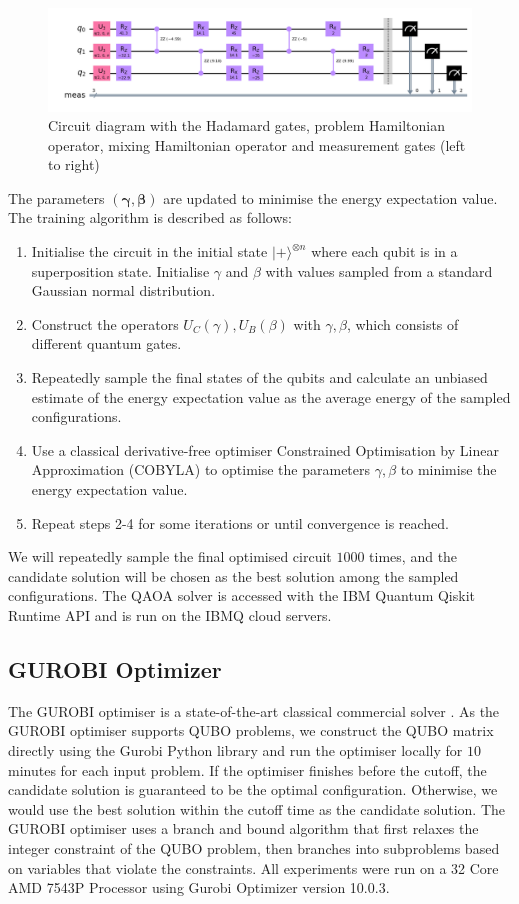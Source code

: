 \begin{figure}[!htb]
    \centering
    \includegraphics[width=1\linewidth]{images/qiskit_circuit.png}
    \caption{Circuit diagram with the Hadamard gates, problem Hamiltonian operator, mixing Hamiltonian operator and measurement gates (left to right)}
    \label{qiskitcircuit}
\end{figure}

The parameters $(\boldsymbol{\gamma}, \boldsymbol{\beta})$ are updated to minimise the energy expectation value. The training algorithm is described as follows:
\begin{enumerate}
    \item Initialise the circuit in the initial state $| + \rangle^{\otimes n}$ where each qubit is in a superposition state. Initialise $\gamma$ and $\beta$ with values sampled from a standard Gaussian normal distribution. 
    \item Construct the operators $U_C(\gamma), U_B(\beta)$ with $\gamma, \beta$, which consists of different quantum gates.
    \item Repeatedly sample the final states of the qubits and calculate an unbiased estimate of the energy expectation value as the average energy of the sampled configurations.
    \item Use a classical derivative-free optimiser Constrained Optimisation by Linear Approximation (COBYLA) to optimise the parameters $\gamma, \beta$ to minimise the energy expectation value.
    \item Repeat steps 2-4 for some iterations or until convergence is reached.
\end{enumerate}
We will repeatedly sample the final optimised circuit $1000$ times, and the candidate solution will be chosen as the best solution among the sampled configurations. The QAOA solver is accessed with the IBM Quantum Qiskit Runtime API and is run on the IBMQ cloud servers.

\subsection{GUROBI Optimizer}
The GUROBI optimiser is a state-of-the-art classical commercial solver \cite{b26}. As the GUROBI optimiser supports QUBO problems, we construct the QUBO matrix directly using the Gurobi Python library and run the optimiser locally for $10$ minutes for each input problem. If the optimiser finishes before the cutoff, the candidate solution is guaranteed to be the optimal configuration. Otherwise, we would use the best solution within the cutoff time as the candidate solution. The GUROBI optimiser uses a branch and bound algorithm that first relaxes the integer constraint of the QUBO problem, then branches into subproblems based on variables that violate the constraints. All experiments were run on a 32 Core AMD 7543P Processor using Gurobi Optimizer version 10.0.3.

